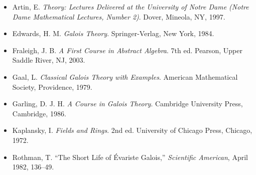 {\small
\begin{itemize}
 
\item[{\bf [1]}] %
Artin, E. {\it Theory: Lectures Delivered at the University of Notre Dame (Notre Dame Mathematical Lectures, Number 2)}. 
Dover, Mineola, NY, 1997.
 
\item[{\bf [2]}]
Edwards, H. M. {\it Galois Theory}. Springer-Verlag, New
York, 1984.
 
\item[{\bf [3]}] %
Fraleigh, J. B. 
{\it A First Course in Abstract Algebra}. 7th ed.
Pearson, Upper Saddle River, NJ, 2003. 
 
\item[{\bf [4]}] %
Gaal, L. {\it Classical Galois Theory with Examples}. 
American Mathematical Society, Providence, 1979. 
 
\item[{\bf [5]}]
Garling, D. J. H. {\it A Course in Galois Theory}.
Cambridge University Press, Cambridge, 1986.
 
 
\item[{\bf [6]}] %
Kaplansky, I. {\it Fields and Rings}. 2nd ed. University of Chicago
Press, Chicago, 1972. 
 
\item[{\bf [7]}]
Rothman, T. ``The Short Life of \'{E}variste Galois,'' {\it
Scientific American}, April 1982, 136--49.
 
\end{itemize}
}
 
 
 
 
 
